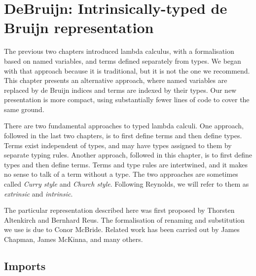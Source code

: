 \hypertarget{DeBruijn}{%
\chapter{DeBruijn: Intrinsically-typed de Bruijn
representation}\label{DeBruijn}}

\begin{fence}
\begin{code}%
\>[0]\AgdaSpace{}%
\AgdaSpace{}%
\<%
\end{code}
\end{fence}

The previous two chapters introduced lambda calculus, with a
formalisation based on named variables, and terms defined separately
from types. We began with that approach because it is traditional, but
it is not the one we recommend. This chapter presents an alternative
approach, where named variables are replaced by de Bruijn indices and
terms are indexed by their types. Our new presentation is more compact,
using substantially fewer lines of code to cover the same ground.

There are two fundamental approaches to typed lambda calculi. One
approach, followed in the last two chapters, is to first define terms
and then define types. Terms exist independent of types, and may have
types assigned to them by separate typing rules. Another approach,
followed in this chapter, is to first define types and then define
terms. Terms and type rules are intertwined, and it makes no sense to
talk of a term without a type. The two approaches are sometimes called
\emph{Curry style} and \emph{Church style}. Following Reynolds, we will
refer to them as \emph{extrinsic} and \emph{intrinsic}.

The particular representation described here was first proposed by
Thorsten Altenkirch and Bernhard Reus. The formalisation of renaming and
substitution we use is due to Conor McBride. Related work has been
carried out by James Chapman, James McKinna, and many others.

\hypertarget{imports}{%
\section{Imports}\label{imports}}

